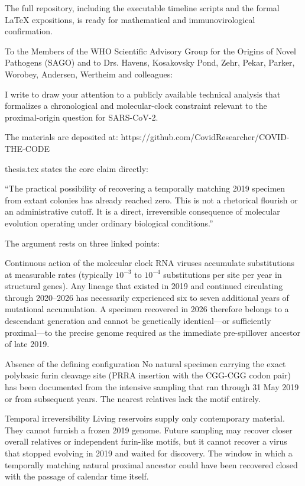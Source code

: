 The full repository, including the executable timeline scripts and the formal LaTeX expositions, is ready for mathematical and immunovirological confirmation.

To the Members of the WHO Scientific Advisory Group for the Origins of Novel Pathogens (SAGO)  
and to Drs. Havens, Kosakovsky Pond, Zehr, Pekar, Parker, Worobey, Andersen, Wertheim and colleagues:

I write to draw your attention to a publicly available technical analysis that formalizes a chronological and molecular-clock constraint relevant to the proximal-origin question for SARS-CoV-2.

The materials are deposited at:  
https://github.com/CovidResearcher/COVID-THE-CODE

thesis.tex states the core claim directly:

“The practical possibility of recovering a temporally matching 2019 specimen from extant colonies has already reached zero.  
This is not a rhetorical flourish or an administrative cutoff. It is a direct, irreversible consequence of molecular evolution operating under ordinary biological conditions.”

The argument rests on three linked points:

Continuous action of the molecular clock  
   RNA viruses accumulate substitutions at measurable rates (typically \(10^{-3}\) to \(10^{-4}\) substitutions per site per year in structural genes). Any lineage that existed in 2019 and continued circulating through 2020–2026 has necessarily experienced six to seven additional years of mutational accumulation. A specimen recovered in 2026 therefore belongs to a descendant generation and cannot be genetically identical—or sufficiently proximal—to the precise genome required as the immediate pre-spillover ancestor of late 2019.

Absence of the defining configuration  
   No natural specimen carrying the exact polybasic furin cleavage site (PRRA insertion with the CGG-CGG codon pair) has been documented from the intensive sampling that ran through 31 May 2019 or from subsequent years. The nearest relatives lack the motif entirely.

Temporal irreversibility  
   Living reservoirs supply only contemporary material. They cannot furnish a frozen 2019 genome. Future sampling may recover closer overall relatives or independent furin-like motifs, but it cannot recover a virus that stopped evolving in 2019 and waited for discovery. The window in which a temporally matching natural proximal ancestor could have been recovered closed with the passage of calendar time itself.


